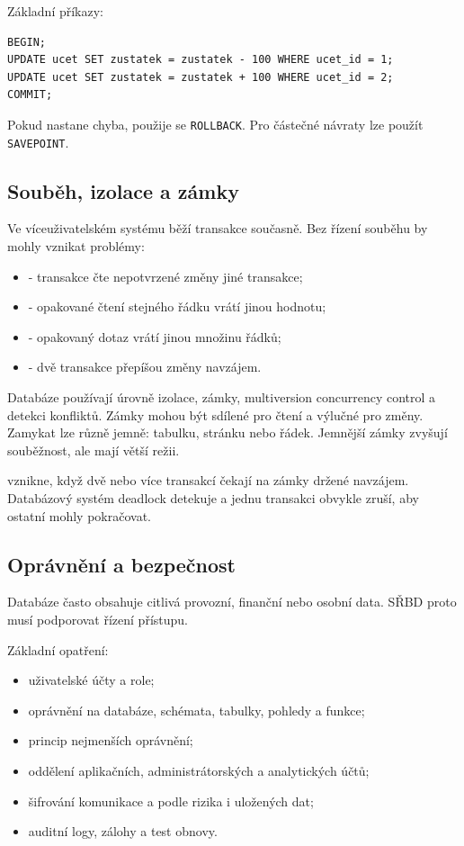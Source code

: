 Základní příkazy:
{\small
\begin{verbatim}
BEGIN;
UPDATE ucet SET zustatek = zustatek - 100 WHERE ucet_id = 1;
UPDATE ucet SET zustatek = zustatek + 100 WHERE ucet_id = 2;
COMMIT;
\end{verbatim}
}

Pokud nastane chyba, použije se \texttt{ROLLBACK}. Pro částečné návraty lze použít \texttt{SAVEPOINT}.

\subsection{Souběh, izolace a zámky}
Ve víceuživatelském systému běží transakce současně. Bez řízení souběhu by mohly vznikat problémy:
\begin{itemize}
  \item {} - transakce čte nepotvrzené změny jiné transakce;
  \item {} - opakované čtení stejného řádku vrátí jinou hodnotu;
  \item {} - opakovaný dotaz vrátí jinou množinu řádků;
  \item {} - dvě transakce přepíšou změny navzájem.
\end{itemize}

Databáze používají úrovně izolace, zámky, multiversion concurrency control a detekci konfliktů.
Zámky mohou být sdílené pro čtení a výlučné pro změny. Zamykat lze různě jemně: tabulku, stránku
nebo řádek. Jemnější zámky zvyšují souběžnost, ale mají větší režii.

 vznikne, když dvě nebo více transakcí čekají na zámky držené navzájem. Databázový
systém deadlock detekuje a jednu transakci obvykle zruší, aby ostatní mohly pokračovat.

\subsection{Oprávnění a bezpečnost}
Databáze často obsahuje citlivá provozní, finanční nebo osobní data. SŘBD proto musí podporovat řízení
přístupu.

Základní opatření:
\begin{itemize}
  \item uživatelské účty a role;
  \item oprávnění na databáze, schémata, tabulky, pohledy a funkce;
  \item princip nejmenších oprávnění;
  \item oddělení aplikačních, administrátorských a analytických účtů;
  \item šifrování komunikace a podle rizika i uložených dat;
  \item auditní logy, zálohy a test obnovy.
\end{itemize}

